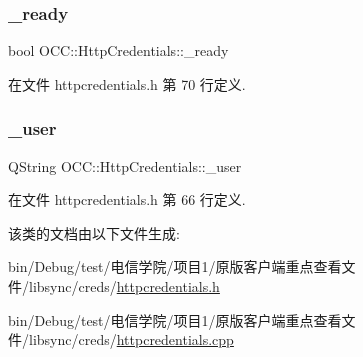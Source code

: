 \subsubsection{\texorpdfstring{\+\_\+ready}{\_ready}}
{\footnotesize\ttfamily bool O\+C\+C\+::\+Http\+Credentials\+::\+\_\+ready\hspace{0.3cm}{\ttfamily [protected]}}



在文件 httpcredentials.\+h 第 70 行定义.

\mbox{\label{class_o_c_c_1_1_http_credentials_a9c8dc6457478a29075dff70cfb72d8c0}} 
\subsubsection{\texorpdfstring{\+\_\+user}{\_user}}
{\footnotesize\ttfamily Q\+String O\+C\+C\+::\+Http\+Credentials\+::\+\_\+user\hspace{0.3cm}{\ttfamily [protected]}}



在文件 httpcredentials.\+h 第 66 行定义.



该类的文档由以下文件生成\+:\begin{DoxyCompactItemize}
\item 
bin/\+Debug/test/电信学院/项目1/原版客户端重点查看文件/libsync/creds/\hyperlink{httpcredentials_8h}{httpcredentials.\+h}\item 
bin/\+Debug/test/电信学院/项目1/原版客户端重点查看文件/libsync/creds/\hyperlink{httpcredentials_8cpp}{httpcredentials.\+cpp}\end{DoxyCompactItemize}
